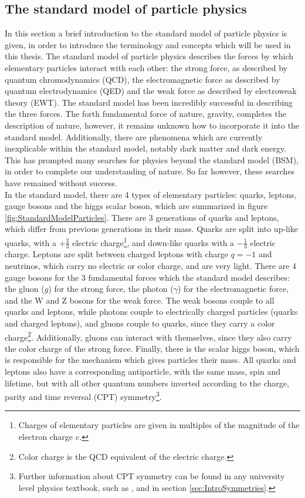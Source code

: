 \subsection{The standard model of particle physics}
In this section a brief introduction to the standard model of particle physics is given, in order to introduce the terminology and concepts which will be used in this thesis. 
The standard model of particle physics describes the forces by which elementary particles interact with each other: the strong force, as described by quantum chromodynamics (QCD), the electromagnetic force as described by quantum electrodynamics (QED) and the weak force as described by electroweak theory (EWT). The standard model has been incredibly successful in describing the three forces. The forth fundamental force of nature, gravity, completes the description of nature, however, it remains unknown how to incorporate it into the standard model. Additionally, there are phenomena which are currently inexplicable within the standard model, notably dark matter and dark energy. This has prompted many searches for physics beyond the standard model (BSM), in order to complete our understanding of nature. So far however, these searches have remained without success. \\

In the standard model, there are 4 types of elementary particles: quarks, leptons, gauge bosons and the higgs scalar boson, which are summarized in figure \ref{fig:StandardModelParticles}. There are 3 generations of quarks and leptons, which differ from previous generations in their mass. Quarks are split into up-like quarks, with a $+\frac{2}{3}$ electric charge\footnote{Charges of elementary particles are given in multiples of the magnitude of the electron charge $e$.}, and down-like quarks with a $-\frac{1}{3}$ electric charge. Leptons are split between charged leptons with charge $q=-1$ and neutrinos, which carry no electric or color charge, and are very light. There are 4 gauge bosons for the 3 fundamental forces which the standard model describes: the gluon ($g$) for the strong force, the photon ($\gamma$) for the electromagnetic force, and the W and Z bosons for the weak force. The weak bosons couple to all quarks and leptons, while photons couple to electrically charged particles (quarks and charged leptons), and gluons couple to quarks, since they carry a color charge\footnote{Color charge is the QCD equivalent of the electric charge.}. Additionally, gluons can interact with themselves, since they also carry the color charge of the strong force.
Finally, there is the scalar higgs boson, which is responsible for the mechanism which gives particles their mass.
All quarks and leptons also have a corresponding antiparticle, with the same mass, spin and lifetime, but with all other quantum numbers inverted according to the charge, parity and time reversal (CPT) symmetry\footnote{Further information about CPT symmetry can be found in any university level physics textbook, such as \cite{}, and in section \ref{sec:IntroSymmetries}.}. \\

